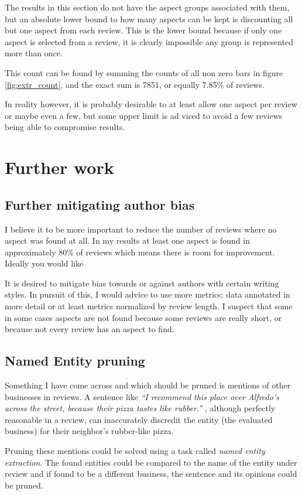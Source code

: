 \documentclass[a4paper,11pt]{kth-mag}
\begin{document}
The results in this section do not have the aspect groups associated with them,
but an absolute lower bound to how many aspects can be kept
is discounting all but one aspect from each review.
This is the lower bound because if only one aspect is selected from a review, it is clearly impossible any
group is represented more than once.

This count can be found by summing the counts of all non zero bars in figure \ref{fig:extr_count}, and the
exact sum is 7851, or equally 7.85\% of reviews.

In reality however, it is probably desirable to at least allow one aspect per review or maybe even a few,
but some upper limit is ad viced to avoid a few reviews being able to compromise results.


\section{Further work}
\subsection{Further mitigating author bias}
I believe it to be more important to reduce the number of reviews where no aspect was
found at all. In my results at least one aspect is found in approximately
80\% of reviews which means there is room for improvement. Ideally you would like 

It is desired to mitigate bias towards or against authors with certain writing styles.
In pursuit of this, I would advice to use more metrics; data annotated in more detail
or at least metrics normalized by review length. I suspect that some in some cases
aspects are not found because some reviews are really short, or because not every review
has an aspect to find.


\subsection{Named Entity pruning}

Something I have come across and which should be pruned is mentions of other businesses
in reviews. A sentence like
\emph{``I recommend this place over Alfredo's across the street, because their pizza tastes like rubber.''}
, although perfectly reasonable in a review, can inaccurately discredit
the entity (the evaluated business) for their neighbor's rubber-like pizza.

Pruning these mentions could be solved using a task called \emph{named entity extraction}.
The found entities could be compared to the name of the entity under review and if found to be a different business,
the sentence and its opinions could be pruned.
\end{document}
